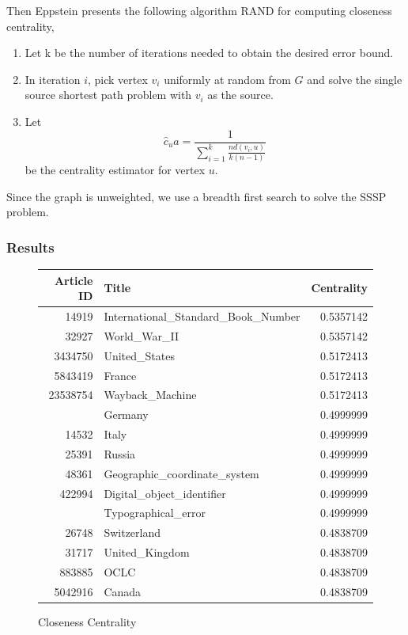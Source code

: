 \documentclass{article}
\begin{document}
Then Eppstein presents the following algorithm RAND for computing closeness centrality,
\begin{enumerate}[1.]
    \item 
    Let k be the number of iterations needed to obtain the desired error bound.

    \item
    In iteration $i$, pick vertex $v_i$ uniformly at random from $G$ and solve the single source shortest path problem with $v_i$ as the source.

    \item 
    Let
    \begin{equation*}
        \hat{c}_ua = \frac{1}{\sum^k_{i=1} \frac{n d(v_i, u)}{k(n-1)}}
    \end{equation*}
    be the centrality estimator for vertex $u$.
\end{enumerate}

Since the graph is unweighted, we use a breadth first search to solve the SSSP problem.

\subsubsection{Results}

\begin{figure}[H]
    \caption[fig]{Closeness Centrality}
    \centering
    \begin{tabular}{rlr}
        \toprule
        Article ID & Title & Centrality \\
        \midrule
        14919 & International\_Standard\_Book\_Number & 0.5357142\\
        32927 & World\_War\_II & 0.5357142\\
        3434750 & United\_States & 0.5172413\\
        5843419 & France & 0.5172413\\
        23538754 & Wayback\_Machine & 0.5172413\\
        \addlinespace
        11867 & Germany & 0.4999999\\
        14532 & Italy & 0.4999999\\
        25391 & Russia & 0.4999999\\
        48361 & Geographic\_coordinate\_system & 0.4999999\\
        422994 & Digital\_object\_identifier & 0.4999999\\
        \addlinespace
        1057428 & Typographical\_error & 0.4999999\\
        26748 & Switzerland & 0.4838709\\
        31717 & United\_Kingdom & 0.4838709\\
        883885 & OCLC & 0.4838709\\
        5042916 & Canada & 0.4838709\\
    \bottomrule
\end{tabular}
\end{figure}
\end{document}
